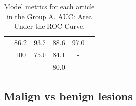 \documentclass{article}
\begin{document}
\begin{table}[]
\begin{tabular}{cccccc}
        \cite{Schieda2017}                  & 86.2                                       & 93.3                                       & 88.6                                    & 97.0                               \\
        \cite{Tu2020}                       & 100                                        & 75.0                                       & 84.1                                    & -                                  \\
        \cite{Romeo2018}                    & -                                          & -                                          & 80.0                                    & -                                  \\
        \bottomrule
    \end{tabular}
    \caption{Model metrics for each article in the Group A. AUC: Area Under the ROC Curve.}
    \label{tab:res_A}
\end{table}

\subsection{Malign vs benign lesions}
\end{document}
